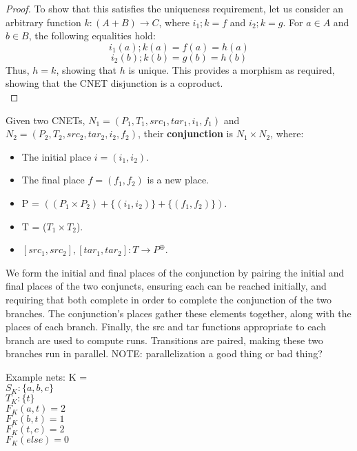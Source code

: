 \begin {proof}
To show that this satisfies the uniqueness requirement, let us consider an arbitrary function $k : (A+B) \to C$, where $i_1;k = f$ and $i_2;k = g$. For $a\in A$ and $b\in B$, the following equalities hold:\\ 
\begin{equation}
i_1(a);k(a) = f(a) = h(a) 
\end {equation}
\begin{equation}
i_2(b);k(b) = g(b) = h(b)
\end{equation}
Thus, $h = k$, showing that $h$ is unique. 
This provides a morphism as required, showing that the CNET disjunction is a coproduct.  
\bigskip\\
\end{proof}
\begin{definition}
  \label{def:AND-PN}
  Given two CNETs, $N_1= (P_1, T_1, src_1, tar_1, i_1, f_1)$ and $N_2= (P_2, T_2, src_2, tar_2, i_2, f_2)$, their \textbf{conjunction} is $N_1 \times N_2$, where: 
\begin{itemize}
\item The initial place $i = (i_1 , i_2)$.
\item The final place $f = (f_1, f_2)$ is a new place.
\item P = $((P_1 \times P_2) + \{(i_1 , i_2)\} + \{(f_1, f_2)\})$.
\item T = ($T_1 \times T_2$).
\item $[src_1, src_2], [tar_1, tar_2]: T\to P^\oplus$. 
\end{itemize}
We form the initial and final places of the conjunction by pairing the initial and final places of the two conjuncts, ensuring each can be reached initially, and requiring that both complete in order to complete the conjunction of the two branches. The conjunction's places gather these elements together, along with the places of each branch. Finally, the src and tar functions appropriate to each branch are used to compute runs. Transitions are paired, making these two branches run in parallel. NOTE: parallelization a good thing or bad thing?  
\end{definition}
\newpage
Example nets:
%
K = \\
$S_K :\{ a, b, c\}$\\
$T_K :\{t\}$\\  
$F_K (a, t) = 2$\\
$F_K (b, t) = 1$\\
$F_K (t, c) = 2$\\
$F_K (else) = 0$\\
